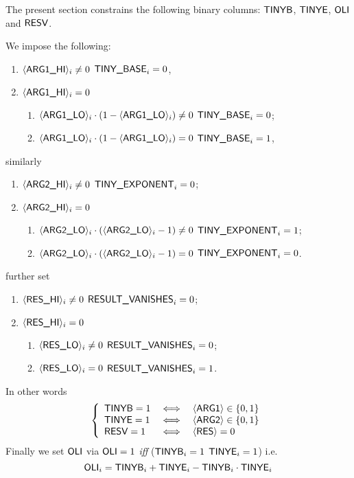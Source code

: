 The present section constrains the following binary columns: $\tinyBase$, $\tinyExponent$, $\oli{}$ and $\resVanishes$.
\begin{center}
\end{center}
We impose the following:
\begin{enumerate}
	\item \If $\iArgOneHi_{i} \neq 0$ \Then $\TINYBASE_{i} = 0$,
	\item \If $\iArgOneHi_{i} =    0$ \Then
	\begin{enumerate}
		\item \If $\iArgOneLo_{i} \cdot (1 - \iArgOneLo_{i}) \neq 0$ \Then $\TINYBASE_{i} = 0$;
		\item \If $\iArgOneLo_{i} \cdot (1 - \iArgOneLo_{i}) =    0$ \Then $\TINYBASE_{i} = 1$,
	\end{enumerate}
\end{enumerate}
similarly
\begin{enumerate}
	\item \If $\iArgTwoHi_{i} \neq 0$ \Then $\TINYEXPONENT_{i} = 0$;
	\item \If $\iArgTwoHi_{i} =    0$ \Then
	\begin{enumerate}
		\item \If $\iArgTwoLo_{i} \cdot (\iArgTwoLo_{i} - 1) \neq 0$ \Then $\TINYEXPONENT_{i} = 1$;
		\item \If $\iArgTwoLo_{i} \cdot (\iArgTwoLo_{i} - 1) =    0$ \Then $\TINYEXPONENT_{i} = 0$.
	\end{enumerate}
\end{enumerate}
further set
\begin{enumerate}
	\item \If $\iResHi_{i} \neq 0$ \Then $\RESVANISHES_{i} = 0$;
	\item \If $\iResHi_{i} =    0$ \Then
	\begin{enumerate}
		\item \If $\iResLo_{i} \neq 0$ \Then $\RESVANISHES_{i} = 0$;
		\item \If $\iResLo_{i} =    0$ \Then $\RESVANISHES_{i} = 1$.
	\end{enumerate}
\end{enumerate}
In other words
\[
	\left\{
	\begin{array}{lcl}
		\tinyBase = 1 & \iff & \iArgOne \in \{0,1\} \\
		\tinyExponent = 1 & \iff & \iArgTwo \in \{0,1\} \\
		\resVanishes = 1 & \iff & \iRes = 0 \\
	\end{array}
	\right.
\]
Finally we set $\oli$ via $\oli = 1$ \emph{iff} \big($\tinyBase_{i} = 1$ \OR{} $\tinyExponent_{i} = 1$\big) i.e.
\[
	\oli_{i} =
	\tinyBase_{i} + \tinyExponent_{i} - \tinyBase_{i} \cdot \tinyExponent_{i}
\]